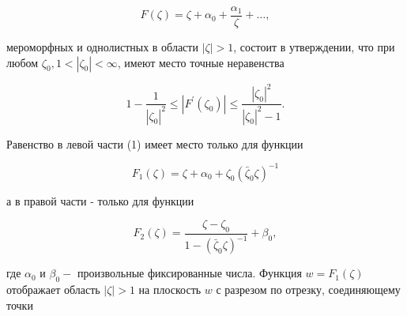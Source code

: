 \documentclass[10pt]{article}
\begin{document}
\[

F(\zeta)=\zeta+\alpha_{0}+\frac{\alpha_{1}}{\zeta}+\ldots,

\]



мероморфных и однолистных в области $|\zeta|>1$, состоит в утверждении, что при любом $\zeta_{0}, 1<\left|\zeta_{0}\right|<\infty$, имеют место точные неравенства



\[

1-\frac{1}{\left|\zeta_{0}\right|^{2}} \leqslant\left|F^{\prime}\left(\zeta_{0}\right)\right| \leqslant \frac{\left|\zeta_{0}\right|^{2}}{\left|\zeta_{0}\right|^{2}-1} .

\]



Равенство в левой части (1) имеет место только для функции



\[

F_{1}(\zeta)=\zeta+\alpha_{0}+\zeta_{0}\left(\bar{\zeta}_{0} \zeta\right)^{-1}

\]



а в правой части - только для функции



\[

F_{2}(\zeta)=\frac{\zeta-\zeta_{0}}{1-\left(\bar{\zeta}_{0} \zeta\right)^{-1}}+\beta_{0},

\]



где $\alpha_{0}$ и $\beta_{0}-$ произвольные фиксированные числа. Функция $w=F_{1}(\zeta)$ отображает область $|\zeta|>1$ на плоскость $w$ с разрезом по отрезку, соединяющему точки
\end{document}

